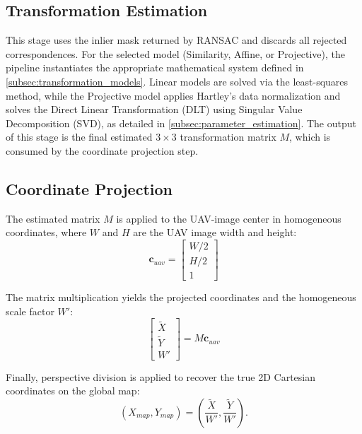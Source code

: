 \subsection{Transformation Estimation}\label{subsec:pipeline_estimation}
This stage uses the inlier mask returned by RANSAC and discards all rejected correspondences. For the selected model (Similarity, Affine, or Projective), the pipeline instantiates the appropriate mathematical system defined in \autoref{subsec:transformation_models}. Linear models are solved via the least-squares method, while the Projective model applies Hartley's data normalization and solves the Direct Linear Transformation (DLT) using Singular Value Decomposition (SVD), as detailed in \autoref{subsec:parameter_estimation}. The output of this stage is the final estimated $3 \times 3$ transformation matrix $M$, which is consumed by the coordinate projection step.

\subsection{Coordinate Projection}\label{subsec:pipeline_projection}
The estimated matrix $M$ is applied to the UAV-image center in homogeneous coordinates, where $W$ and $H$ are the UAV image width and height:
\begin{equation}
\mathbf{c}_{uav} =
\begin{bmatrix}
W/2 \\
H/2 \\
1
\end{bmatrix}
\end{equation}

The matrix multiplication yields the projected coordinates and the homogeneous scale factor $W'$:
\begin{equation}
\begin{bmatrix}
\tilde{X} \\
\tilde{Y} \\
W'
\end{bmatrix}
= M\mathbf{c}_{uav}
\end{equation}

Finally, perspective division is applied to recover the true 2D Cartesian coordinates on the global map: 
\begin{equation}
(X_{map}, Y_{map}) = \left(\frac{\tilde{X}}{W'}, \frac{\tilde{Y}}{W'}\right).
\end{equation}

